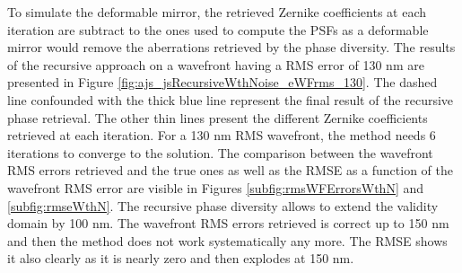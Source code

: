 To simulate the deformable mirror, the retrieved Zernike coefficients at each iteration are subtract to the ones used to compute the PSFs as a deformable mirror would remove the aberrations retrieved by the phase diversity. The results of the recursive approach on a wavefront having a RMS error of 130 nm are presented in Figure \ref{fig:ajs_jsRecursiveWthNoise_eWFrms_130}. The dashed line confounded with the thick blue line represent the final result of the recursive phase retrieval. The other thin lines present the different Zernike coefficients retrieved at each iteration. For a 130 nm RMS wavefront, the method needs 6 iterations to converge to the solution. The comparison between the wavefront RMS errors retrieved and the true ones as well as the RMSE as a function of the wavefront RMS error are visible in Figures \ref{subfig:rmsWFErrorsWthN} and \ref{subfig:rmseWthN}. The recursive phase diversity allows to extend the validity domain by 100 nm. The wavefront RMS errors retrieved is correct up to 150 nm and then the method does not work systematically any more. The RMSE shows it also clearly as it is nearly zero and then explodes at 150 nm.

